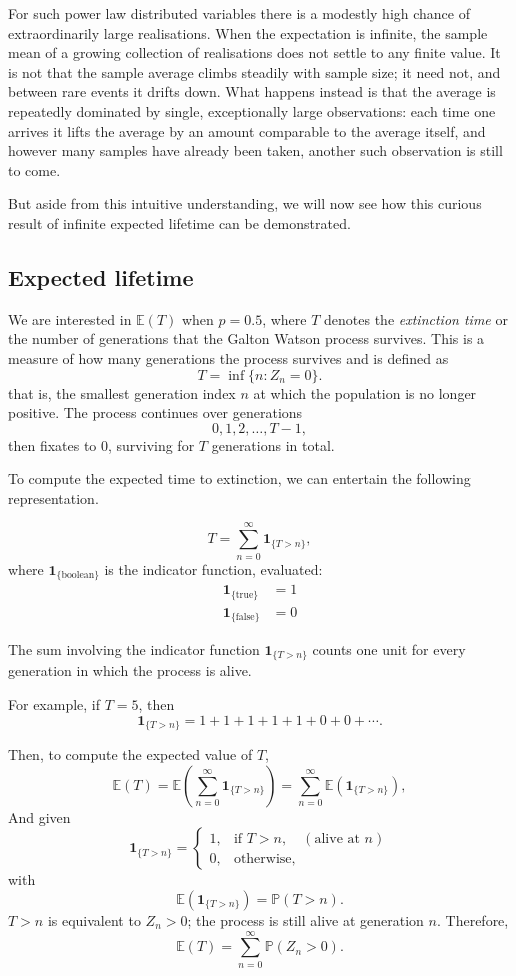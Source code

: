 \noindent
For such power law distributed variables there is a modestly high chance of extraordinarily large realisations.
When the expectation is infinite, the sample mean of a growing collection of realisations does not settle to any finite value.
It is not that the sample average climbs steadily with sample size; it need not, and between rare events it drifts down.
What happens instead is that the average is repeatedly dominated by single, exceptionally large observations: each time one arrives it lifts the average by an amount comparable to the average itself, and however many samples have already been taken, another such observation is still to come.

But aside from this intuitive understanding, we will now see how this curious result of infinite expected lifetime can be demonstrated.

\subsection{Expected lifetime}

We are interested in $\mathbb{E}(T)$ when $p = 0.5$, where $T$ denotes the
\emph{extinction time} or the number of generations that the Galton Watson process survives. This is a measure of how many generations the process
survives and is defined as
\[
T = \inf \{ n : Z_n = 0 \}.
\]
that is, the smallest generation index $n$ at which the population is no longer positive.
The process continues over generations
\[
0, 1, 2, \dots, T-1,
\]
then fixates to 0, surviving for $T$ generations in total.

To compute the expected time to extinction, we can entertain the following representation.

\[
T = \sum_{n=0}^{\infty} \mathbf{1}_{\{ T > n \}},
\]
where $\mathbf{1}_{\{\text{boolean}\}}$ is the indicator function, evaluated:
\begin{align*}
    \mathbf{1}_{\{ \text{true}\}} &= 1 \\
    \mathbf{1}_{\{ \text{false}\}} &= 0
\end{align*}



\noindent
The sum involving the indicator function $\mathbf{1}_{\{T>n\}}$ counts one unit
for every generation in which the process is alive.

For example, if $T = 5$, then
\[
\mathbf{1}_{\{T>n\}} = 1 + 1 + 1 + 1 + 1 + 0 + 0 + \cdots .
\]

\noindent
Then, to compute the expected value of $T$,
\[
\mathbb{E}(T)
= \mathbb{E}\!\left( \sum_{n=0}^{\infty} \mathbf{1}_{\{T>n\} } \right)
= \sum_{n=0}^{\infty} \mathbb{E}\!\left( \mathbf{1}_{\{T>n\}} \right),
\]
And given
\[
\mathbf{1}_{\{T>n\}} =
\begin{cases} 
1, & \text{if } T>n, \quad(\text{alive at } n) \\
0, & \text{otherwise},
\end{cases}
\]
with
\[
\mathbb{E}\!\left( \mathbf{1}_{\{T>n\}} \right)
= \mathbb{P}(T>n).
\]
\noindent
$T>n$ is equivalent to $Z_n>0$; the process is still
alive at generation $n$. Therefore,
\[
\mathbb{E}(T)
= \sum_{n=0}^{\infty} \mathbb{P}(Z_n>0).
\]

